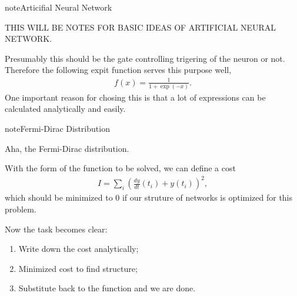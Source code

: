 \documentclass[letterpaper,12pt,english]{sphinxmanual}
\begin{document}
\begin{sphinxadmonition}{note}{Articifial Neural Network}

THIS WILL BE NOTES FOR BASIC IDEAS OF ARTIFICIAL NEURAL NETWORK.
\end{sphinxadmonition}

Presumably this should be the gate controlling trigering of the neuron or not. Therefore the following expit function serves this purpose well,
\begin{equation*}
\begin{split}f(x) = \frac{1}{1+\exp(-x)}.\end{split}
\end{equation*}
One important reason for chosing this is that a lot of expressions can be calculated analytically and easily.

\begin{sphinxadmonition}{note}{Fermi-Dirac Distribution}

Aha, the Fermi-Dirac distribution.
\end{sphinxadmonition}

With the form of the function to be solved, we can define a cost
\begin{equation*}
\begin{split}I=\sum_i\left( \frac{dy}{dt}(t_i)+y(t_i) \right)^2,\end{split}
\end{equation*}
which should be minimized to 0 if our struture of networks is optimized for this problem.

Now the task becomes clear:
\begin{enumerate}
\item {} 
Write down the cost analytically;

\item {} 
Minimized cost to find structure;

\item {} 
Substitute back to the function and we are done.

\end{enumerate}
\end{document}
